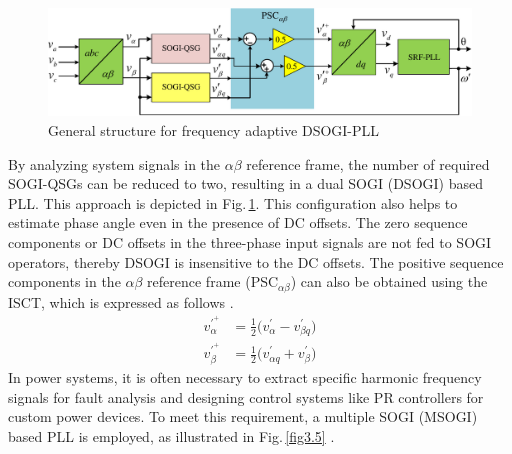 \begin{figure}[]   
	\centering
	\includegraphics[scale=0.65]{figures/Chapter_3/Mine/DSOGI-PLL.pdf}
	\caption{General structure for frequency adaptive DSOGI-PLL}
	\label{fig3.4}
\end{figure} 
By analyzing system signals in the $\alpha\beta$ reference frame, the number of required SOGI-QSGs can be reduced to two, resulting in a dual SOGI (DSOGI) based PLL. This approach is depicted in Fig.\,\ref{fig3.4}. This configuration also helps to estimate phase angle even in the presence of DC offsets. The zero sequence components or DC offsets in the three-phase input signals are not fed to SOGI operators, thereby DSOGI is insensitive to the DC offsets. The positive sequence components in the $\alpha\beta$ reference frame (PSC$_{\alpha \beta}$) can also be obtained using the ISCT, which is expressed as follows \cite{1712059}.
\begin{equation} \label{3.3a}
		\begin{aligned}
			v^{\prime^{+}}_{\alpha} &= \frac{1}{2} \Big( v^{\prime}_{\alpha} - v^{\prime}_{\beta q}  \Big) \\
			v^{\prime^{+}}_{\beta} &= \frac{1}{2} \Big( v^{\prime}_{\alpha q} + v^{\prime}_{\beta}  \Big)
		\end{aligned}
\end{equation} 
In power systems, it is often necessary to extract specific harmonic frequency signals for fault analysis and designing control systems like PR controllers for custom power devices. To meet this requirement, a multiple SOGI (MSOGI) based PLL is employed, as illustrated in Fig.\,\ref{fig3.5} \cite{4758048,5446347}. 

